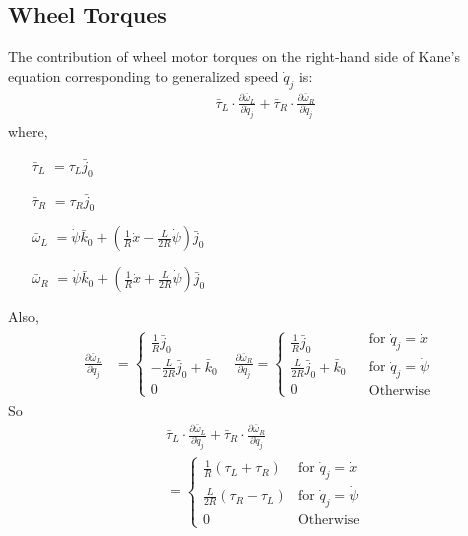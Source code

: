 \documentclass[a4paper,10pt]{article}
\begin{document}
\subsection{Wheel Torques}
The contribution of wheel motor torques on the right-hand side of Kane's equation corresponding to generalized speed $\dot{q}_j$ is:
\begin{align}
 &\bar\tau_L \cdot \frac{\partial \bar\omega_L}{\partial \dot{q}_j} + \bar\tau_R \cdot \frac{\partial \bar\omega_R}{\partial \dot{q}_j} \label{wheelTorque1}
\end{align}
where,
\begin{itemize}[label={}]
 \item[$\bar\tau_L$] $=\tau_L\bar{j}_0$
 \item[$\bar\tau_R$] $=\tau_R\bar{j}_0$
 \item[$\bar\omega_L$] $=\dot\psi\bar{k}_0 + \left(\frac{1}{R}\dot{x}-\frac{L}{2R}\dot\psi\right)\bar{j}_0$
 \item[$\bar\omega_R$] $=\dot\psi\bar{k}_0 + \left(\frac{1}{R}\dot{x}+\frac{L}{2R}\dot\psi\right)\bar{j}_0$
\end{itemize}
Also,
\begin{align}
 \frac{\partial \bar\omega_L}{\partial \dot{q}_j} &= \begin{cases}
							\frac{1}{R}\bar{j}_0 \\
							-\frac{L}{2R}\bar{j}_0+\bar{k}_0  \\
							0 
						       \end{cases} &
  \frac{\partial \bar\omega_R}{\partial \dot{q}_j} = \begin{cases}
							\frac{1}{R}\bar{j}_0  \\
							\frac{L}{2R}\bar{j}_0+\bar{k}_0 \\
							0 
						       \end{cases} &
  \begin{matrix} \mbox{for } \dot{q}_j = \dot{x} \\ \mbox{for } \dot{q}_j = \dot\psi \\ \mbox{Otherwise} \end{matrix}
\end{align}
So
\begin{align}
 &\bar\tau_L \cdot \frac{\partial \bar\omega_L}{\partial \dot{q}_j} + \bar\tau_R \cdot \frac{\partial \bar\omega_R}{\partial \dot{q}_j} \nonumber \\
 &= \begin{cases}
     \frac{1}{R}\left( \tau_L + \tau_R \right) & \mbox{for } \dot{q}_j = \dot{x} \\
     \frac{L}{2R}\left( \tau_R - \tau_L \right)& \mbox{for } \dot{q}_j = \dot\psi \\
     0 & \mbox{Otherwise}
    \end{cases} \label{wheelTorque2}
\end{align}
\end{document}
